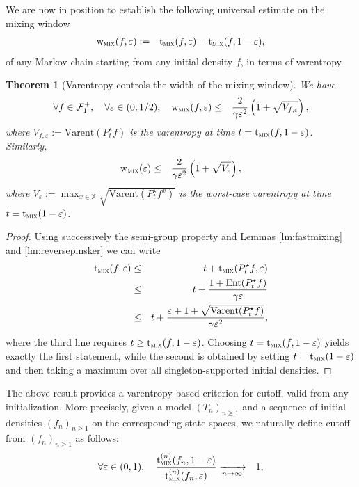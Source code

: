 \documentclass[12pt,final]{article}
\newtheorem{theorem}{Theorem}[section]
\numberwithin{equation}{section}
\newcommand{\Ent}{\mathrm{Ent}}
\newcommand{\Varent}{\mathrm{Varent}}
\newcommand{\cF}{\mathcal {F}}
\newcommand{\dX}{\mathbb{X}}
\newcommand{\tmix}{{\rm t}_{\textsc{mix}}}
\newcommand{\wmix}{{\rm w}_{\textsc{mix}}}
\begin{document}
We are now in position to establish the following  universal estimate on the  mixing window 
\begin{eqnarray}
\wmix(f,\varepsilon) & := & \tmix(f,\varepsilon)-\tmix(f,1-\varepsilon),
\end{eqnarray}
of any Markov chain starting from any initial density $f$, in terms of varentropy. 
\begin{theorem}[Varentropy controls the width of the mixing window]\label{th:main}We have
\begin{eqnarray*}
\forall f\in\cF_1^+,\quad\forall \varepsilon\in(0,1/2),\quad \wmix(f,\varepsilon) & \le & \frac{2}{\gamma \varepsilon^2}\left(1+\sqrt{V_{f,\varepsilon}}\right),
\end{eqnarray*}
where $V_{f,\varepsilon}:=\Varent(P_t^\star f)$ is the varentropy at time $t=\tmix(f,1-\varepsilon)$. Similarly,
\begin{eqnarray*}
\wmix(\varepsilon) & \le & \frac{2}{\gamma \varepsilon^2}\left(1+\sqrt{V_{\varepsilon}}\right),
\end{eqnarray*}
where $V_\varepsilon:=\max_{x\in\dX}\sqrt{\Varent(P_t^\star f^x)}$ is the worst-case varentropy at time $t = \tmix(1-\varepsilon)$.
\end{theorem}
\begin{proof}Using successively the semi-group property and Lemmas \ref{lm:fastmixing} and \ref{lm:reversepinsker} we can write
 \begin{eqnarray*}
\tmix(f,\varepsilon)  & \le & t+ \tmix(P_t^\star f,\varepsilon)\\
& \le & t+\frac{1+\Ent(P_t^\star f)}{\gamma\varepsilon}\\
& \le & t+\frac{\varepsilon+1+\sqrt{\Varent(P_t^\star f)}}{\gamma\varepsilon^2},
\end{eqnarray*} 
where the third line requires $t\ge \tmix(f,1-\varepsilon)$. Choosing $t=\tmix(f,1-\varepsilon)$ yields exactly the first statement, while the second is obtained by setting $t=\tmix(1-\varepsilon)$ and then taking a maximum over all singleton-supported initial densities. 
\end{proof}
The above result provides a varentropy-based criterion for cutoff, valid from any initialization. More precisely, given a model $(T_n)_{n\ge 1}$ and a sequence of initial densities $(f_n)_{n\ge 1}$ on the corresponding state spaces, we naturally define cutoff from $(f_n)_{n\ge 1}$ as follows:
\begin{eqnarray*}
\forall \varepsilon\in(0,1),\quad
\frac{\tmix^{(n)}(f_n,1-\varepsilon)}{\tmix^{(n)}(f_n,\varepsilon)} & \xrightarrow[n\to\infty]{} & 1,
\end{eqnarray*}
\end{document}

